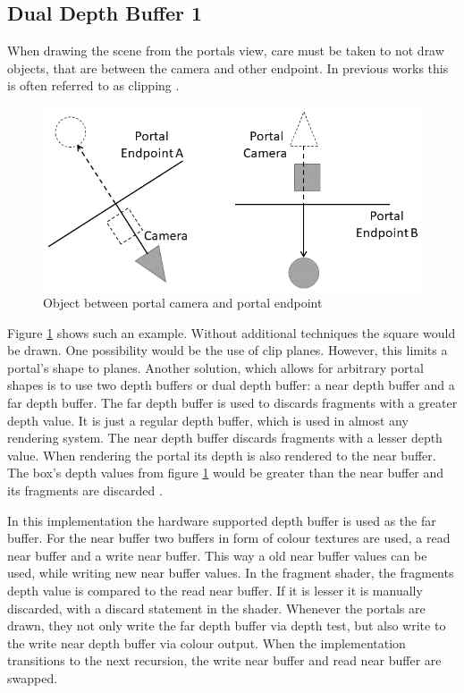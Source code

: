 \subsection{Dual Depth Buffer 1}

When drawing the scene from the portals view, care must be taken to not draw objects, that are between the camera and other endpoint. In previous works this is often referred to as clipping \cite{lowe:2005:technique}.
\begin{figure}[h]
	\includegraphics[width=\linewidth]{images/bananajuce.png}
	\caption{Object between portal camera and portal endpoint}
	\label{fig:bananajuce}
\end{figure}

Figure \ref{fig:bananajuce} shows such an example. Without additional techniques the square would be drawn. One possibility would be the use of clip planes. However, this limits a portal's shape to planes. Another solution, which allows for arbitrary portal shapes is to use two depth buffers or dual depth buffer: a near depth buffer and a far depth buffer. The far depth buffer is used to discards fragments with a greater depth value. It is just a regular depth buffer, which is used in almost any rendering system. The near depth buffer discards fragments with a lesser depth value. When rendering the portal its depth is also rendered to the near buffer. The box's depth values from figure \ref{fig:bananajuce} would be greater than the near buffer and its fragments are discarded \cite{lowe:2005:technique, ropinski:2004:real}.

In this implementation the hardware supported depth buffer is used as the far buffer. For the near buffer two buffers in form of colour textures are used, a read near buffer and a write near buffer. This way a old near buffer values can be used, while writing new near buffer values. In the fragment shader, the fragments depth value is compared to the read near buffer. If it is lesser it is manually discarded, with a discard statement in the shader. Whenever the portals are drawn, they not only write the far depth buffer via depth test, but also write to the write near depth buffer via colour output. When the implementation transitions to the next recursion, the write near buffer and read near buffer are swapped.

